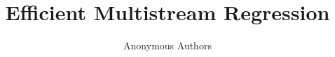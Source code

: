 \documentclass[conference,compsoc]{IEEEtran}
\begin{document}
%
\title{Efficient Multistream Regression}


\author{Anonymous Authors}


% 








\maketitle
\end{document}
